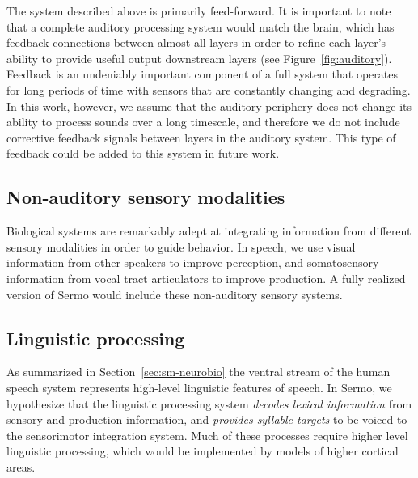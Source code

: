 The system described above
is primarily feed-forward.
It is important to note that
a complete auditory processing system
would match the brain,
which has feedback connections
between almost all layers
in order to refine each layer's ability
to provide useful output downstream layers
(see Figure~\ref{fig:auditory}).
Feedback is an undeniably important
component of a full system that operates
for long periods of time with sensors
that are constantly changing and degrading.
In this work, however, we assume
that the auditory periphery does not change
its ability to process sounds over a long timescale,
and therefore we do not include corrective feedback
signals between layers in the auditory system.
This type of feedback could be added
to this system in future work.

\subsection{Non-auditory sensory modalities}

Biological systems are remarkably adept
at integrating information
from different sensory modalities
in order to guide behavior.
In speech,
we use visual information
from other speakers to improve perception,
and somatosensory information
from vocal tract articulators
to improve production.
A fully realized version of Sermo
would include these non-auditory sensory systems.

\subsection{Linguistic processing}


As summarized in Section~\ref{sec:sm-neurobio}
the ventral stream of the human speech system
represents high-level linguistic features of speech.
In Sermo, we hypothesize that
the linguistic processing system
\textit{decodes lexical information}
from sensory and production information,
and \textit{provides syllable targets}
to be voiced to the sensorimotor integration system.
Much of these processes require
higher level linguistic processing,
which would be implemented by
models of higher cortical areas.

